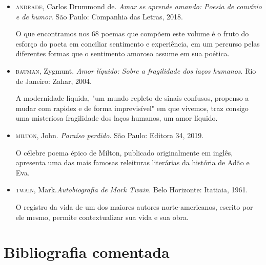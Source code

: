 \documentclass[12pt]{extarticle}
\begin{document}
\begin{itemize}
\item\textsc{andrade}, Carlos Drummond de. \textit{Amar se aprende amando: Poesia de
convívio e de humor}. São Paulo: Companhia das Letras, 2018.

O que encontramos nos 68 poemas que compõem este volume é o fruto do
esforço do poeta em conciliar sentimento e experiência, em um percurso
pelas diferentes formas que o sentimento amoroso assume em sua poética.

\item\textsc{bauman}, Zygmunt. \textit{Amor líquido: Sobre a fragilidade dos laços
humanos}. Rio de Janeiro: Zahar, 2004. 

A modernidade líquida, "um mundo repleto de sinais confusos, propenso a
mudar com rapidez e de forma imprevisível" em que vivemos, traz consigo
uma misteriosa fragilidade dos laços humanos, um amor líquido.

\item\textsc{milton}, John. \textit{Paraíso perdido}. São Paulo: Editora 34, 2019.

O célebre poema épico de Milton, publicado originalmente em inglês,
apresenta uma das mais famosas releituras literárias da história de Adão
e Eva.

\item\textsc{twain}, Mark.\textit{Autobiografia de Mark Twain}. Belo Horizonte:
Itatiaia, 1961.

O registro da vida de um dos maiores autores norte-americanos, escrito
por ele mesmo, permite contextualizar sua vida e sua obra.
\end{itemize}

\section{Bibliografia comentada}
\end{document}
